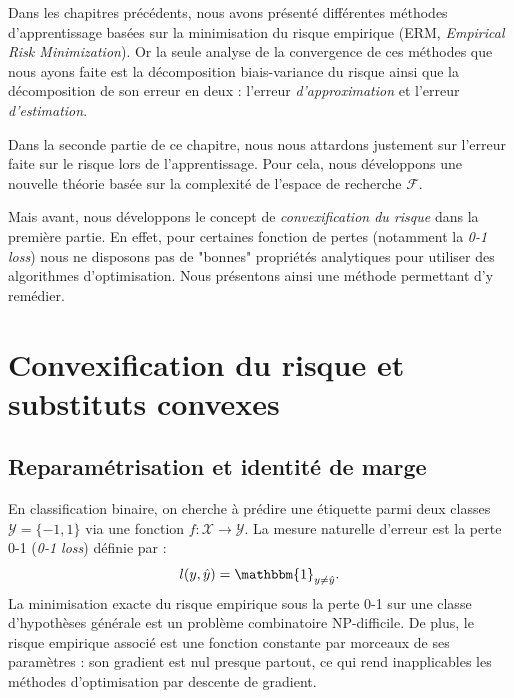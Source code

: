 
\label{ch:theorie_apprentissage}

\minitoc 

Dans les chapitres précédents, nous avons présenté différentes méthodes d'apprentissage basées sur la minimisation du risque empirique (ERM, \emph{Empirical Risk Minimization}). Or la seule analyse de la convergence de ces méthodes que nous ayons faite est la décomposition biais-variance du risque ainsi que la décomposition de son erreur en deux : l'erreur \emph{d'approximation} et l'erreur \emph{d'estimation}. 

Dans la seconde partie de ce chapitre, nous nous attardons justement sur l'erreur faite sur le risque lors de l'apprentissage. Pour cela, nous développons une nouvelle théorie basée sur la complexité de l'espace de recherche $ \mathcal{F}$. 

Mais avant, nous développons le concept de \emph{convexification du risque} dans la première partie. En effet, pour certaines fonction de pertes (notamment la \emph{0-1 loss}) nous ne disposons pas de "bonnes" propriétés analytiques pour utiliser des algorithmes d'optimisation. Nous présentons ainsi une méthode permettant d'y remédier. 


\section{Convexification du risque et substituts convexes}

\subsection{Reparamétrisation et identité de marge}

En classification binaire, on cherche à prédire une étiquette parmi deux classes $\mathcal{Y} = \{-1, 1\}$ via une fonction $f : \mathcal{X} \to \mathcal{Y}$. La mesure naturelle d'erreur est la perte 0-1 (\emph{0-1 loss}) définie par : 
\begin{equation}
    l(y, \hat{y}) = \mathbbm{1}_{y \neq \hat{y}}.
\end{equation}
La minimisation exacte du risque empirique sous la perte 0-1 sur une classe d'hypothèses générale est un problème combinatoire NP-difficile. De plus, le risque empirique associé est une fonction constante par morceaux de ses paramètres : son gradient est nul presque partout, ce qui rend inapplicables les méthodes d'optimisation par descente de gradient.

